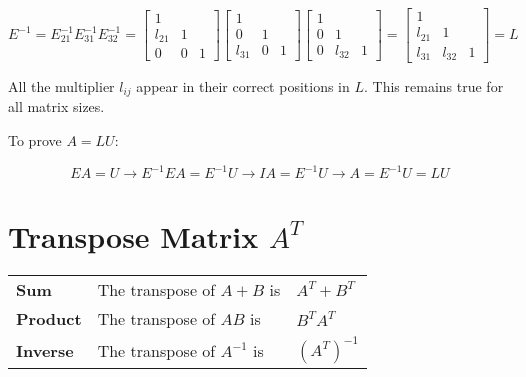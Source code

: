 \[
    E^{-1} = E_{21}^{-1}E_{31}^{-1}E_{32}^{-1}
    =
    \begin{bmatrix}
        1              \\
        l_{21} & 1     \\
        0      & 0 & 1
    \end{bmatrix}
    \begin{bmatrix}
        1              \\
        0      & 1     \\
        l_{31} & 0 & 1
    \end{bmatrix}
    \begin{bmatrix}
        1              \\
        0 & 1          \\
        0 & l_{32} & 1
    \end{bmatrix}
    =
    \begin{bmatrix}
        1                   \\
        l_{21} & 1          \\
        l_{31} & l_{32} & 1
    \end{bmatrix}
    = L
\]

\noindent All the multiplier $l_{ij}$ appear in their correct positions in $L$. This remains true for all matrix sizes.

\begin{mdframed}
    To prove $A = LU$:

    \[
        EA = U \rightarrow E^{-1}EA = E^{-1}U
        \rightarrow IA = E^{-1}U \rightarrow A = E^{-1}U = LU
    \]
\end{mdframed}

\section{Transpose Matrix $A^T$}

\begin{mdframed}
    \begin{tabular}{l l l}
        \textbf{Sum}     & The transpose of \( A + B \) is  & \( A^T + B^T \)  \\
        \textbf{Product} & The transpose of \( AB \) is     & \( B^T A^T \)    \\
        \textbf{Inverse} & The transpose of \( A^{-1} \) is & \( (A^T)^{-1} \)
    \end{tabular}
\end{mdframed}

